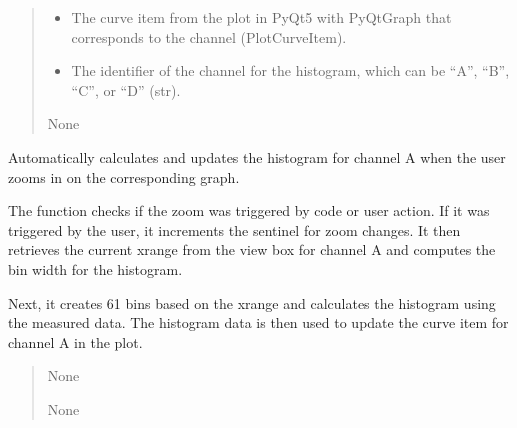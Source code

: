 \documentclass[letterpaper,10pt,english]{sphinxmanual}
\begin{document}
\begin{fulllineitems}
\begin{fulllineitems}
\begin{quote}
\begin{description}
\begin{itemize}
\item {} 
\sphinxAtStartPar
{} \textendash{} The curve item from the plot in PyQt5 with PyQtGraph that corresponds 
to the channel (PlotCurveItem).

\item {} 
\sphinxAtStartPar
{} \textendash{} The identifier of the channel for the histogram, which can 
be “A”, “B”, “C”, or “D” (str).

\end{itemize}

\sphinxAtStartPar
None

\end{description}\end{quote}

\end{fulllineitems}


\begin{fulllineitems}
\label{\detokenize{StartStopHist:StartStopHist.StartStopLogic.zoom_changedA}}
\pysigstartsignatures
{}
\pysigstopsignatures
\sphinxAtStartPar
Automatically calculates and updates the histogram for channel A when the user 
zooms in on the corresponding graph.

\sphinxAtStartPar
The function checks if the zoom was triggered by code or user action. If it was 
triggered by the user, it increments the sentinel for zoom changes. It then 
retrieves the current x\sphinxhyphen{}range from the view box for channel A and computes the 
bin width for the histogram.

\sphinxAtStartPar
Next, it creates 61 bins based on the x\sphinxhyphen{}range and calculates the histogram 
using the measured data. The histogram data is then used to update the curve 
item for channel A in the plot.
\begin{quote}\begin{description}
\sphinxAtStartPar
None

\sphinxAtStartPar
None

\end{description}\end{quote}


\end{fulllineitems}
\end{fulllineitems}
\end{document}
